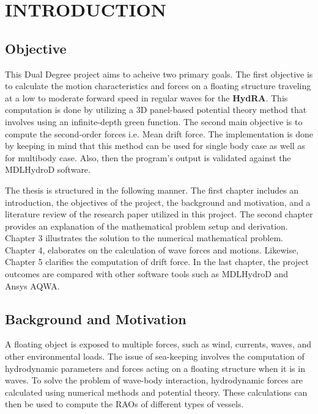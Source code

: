 \chapter{INTRODUCTION}

\section{Objective}
This Dual Degree project aims to acheive two primary goals. The first objective is to calculate 
the motion characteristics and forces on a floating structure traveling at a low to moderate 
forward speed in regular waves for the {\bf HydRA}. This computation is done by utilizing a 3D 
panel-based potential theory method that involves using an infinite-depth green function. 
The second main objective is to compute the second-order forces i.e. Mean drift force. 
The implementation is done by keeping in mind that this method can be used for single body case 
as well as for multibody case. Also, then the program's output is validated against 
the MDLHydroD software.

The thesis is structured in the following manner. The first chapter includes an introduction, 
the objectives of the project, the background and motivation, and a literature review of the 
research paper utilized in this project. The second chapter provides an explanation of the 
mathematical problem setup and derivation. Chapter 3 illustrates the solution to the numerical 
mathematical problem. Chapter 4, elaborates on the calculation of wave 
forces and motions. Likewise, Chapter 5 clarifies 
the computation of drift force. In the last chapter, the project outcomes are compared with 
other software tools such as MDLHydroD and Ansys AQWA.


\newpage
\section{Background and Motivation}
A floating object is exposed to multiple forces, such as wind, currents, waves, and other 
environmental loads. The issue of sea-keeping involves the computation of hydrodynamic 
parameters and forces acting on a floating structure when it is in waves. To solve the 
problem of wave-body interaction, hydrodynamic forces are calculated using numerical 
methods and potential theory. These calculations can then be used to compute the RAOs 
of different types of vessels.

